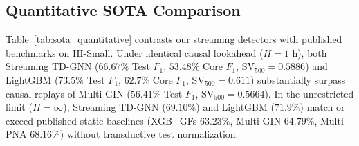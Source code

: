 \documentclass[sigconf,nonacm]{acmart}
\begin{document}
\subsection{Quantitative SOTA Comparison}
Table~\ref{tab:sota_quantitative} contrasts our streaming detectors with published benchmarks on HI-Small. Under identical causal lookahead ($H = 1\text{ h}$), both Streaming TD-GNN ($66.67\%$ Test $F_1$, $53.48\%$ Core $F_1$, $\text{SV}_{500} = 0.5886$) and LightGBM ($73.5\%$ Test $F_1$, $62.7\%$ Core $F_1$, $\text{SV}_{500} = 0.611$) substantially surpass causal replays of Multi-GIN ($56.41\%$ Test $F_1$, $\text{SV}_{500} = 0.5664$). In the unrestricted limit ($H = \infty$), Streaming TD-GNN ($69.10\%$) and LightGBM ($71.9\%$) match or exceed published static baselines (XGB+GFs $63.23\%$, Multi-GIN $64.79\%$, Multi-PNA $68.16\%$) without transductive test normalization.
\end{document}
